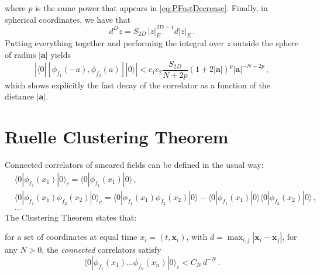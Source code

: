 where $p$ is the same power that appears in \eqref{eq:PFastDecrease}. Finally, in spherical coordinates, 
we have that 
\[
    d^Dz = S_{2D}\, |z|_E^{2D-1} d|z|_E\, .   
\]
Putting everything together and performing the integral over $z$ outside the sphere of radius 
$|\mathbf{a}|$ yields
\begin{equation}
    \label{eq:BoundOnSmearCorr}
    \left|\langle 0 |
        \left[ \phi_{f_1}(-a), \phi_{f_2}(a)\right]
        | 0 \rangle \right| < 
        c_1 c_2 \frac{S_{2D}}{N+2p} \left(1 + 2 |\mathbf{a}|\right)^p
        |\mathbf{a}|^{-N-2p}\, , 
\end{equation}
which shows explicitly the fast decay of the correlator as a function of the distance $|\mathbf{a}|$.

\section{Ruelle Clustering Theorem}
\label{sec:RuelleClust}

Connected correlators of smeared fields can be defined in the usual way:
\begin{align}
    &\langle 0 | \phi_{f_1}(x_1) | 0 \rangle_c 
        = \langle 0 | \phi_{f_1}(x_1) | 0 \rangle \, , \\
    &\langle 0 | \phi_{f_1}(x_1) \phi_{f_2}(x_2) | 0 \rangle_c 
        = \langle 0 | \phi_{f_1}(x_1) \phi_{f_2}(x_2) | 0 \rangle -
           \langle 0 | \phi_{f_1}(x_1) | 0 \rangle \langle 0 | \phi_{f_2}(x_2) | 0 \rangle\, , \\
    &\ldots \nonumber
\end{align}
The Clustering Theorem states that: 

\begin{Thm}
    for a set of coordinates at equal time $x_i=(t,\mathbf{x}_i)$, 
    with $d=\max_{i,j} |\mathbf{x}_i - \mathbf{x}_j|$, for any $N>0$, 
    the {\em connected} correlators satisfy
    \begin{equation}
        \label{eq:RuelleClusteringThm}
        \langle 0 | \phi_{f_1}(x_1) \ldots \phi_{f_n}(x_n) | 0 \rangle_c < C_N\, d^{-N}\, .
    \end{equation}        
\end{Thm}

